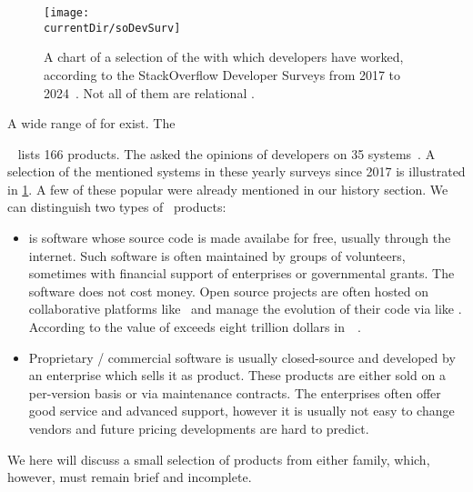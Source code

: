 %
\label{sec:software}%
\FloatBarrier%
%
\begin{figure}%
\centering%
\texttt{[image: \\currentDir/soDevSurv]}%
\caption{A chart of a selection of the  with which developers have worked, according to the StackOverflow Developer Surveys from 2017 to 2024~\cite{SE:SO:2024DS}. %
Not all of them are relational .}%
\label{fig:soDevSurv}%
\end{figure}%
%
A wide range of  for  exist.
The \begin{noglslink}\end{noglslink}~\cite{RS2025DERORD} lists 166 products.
The  asked the opinions of developers on 35 systems~\cite{SE:SO:2024DS}.
A selection of the mentioned systems in these yearly surveys since 2017 is illustrated in \cref{fig:soDevSurv}.
A few of these popular  were already mentioned in our history section.
We can distinguish two types of \db\ products:%
\begin{itemize}%
%
\item {} is software whose source code is made availabe for free, usually through the internet.
Such software is often maintained by groups of volunteers, sometimes with financial support of enterprises or governmental grants.
The software does not cost money.
Open source projects are often hosted on collaborative platforms like \github\ and manage the evolution of their code via  like \git.
According to \citeauthor{HNZ2024TVOOSS} the value of  exceeds eight trillion dollars in~\citeyear{HNZ2024TVOOSS}~\cite{HNZ2024TVOOSS}.
%
\item Proprietary / commercial software is usually closed-source and developed by an enterprise which sells it as product.
These products are either sold on a per-version basis or via maintenance contracts.
The enterprises often offer good service and advanced support, however it is usually not easy to change vendors and future pricing developments are hard to predict.%
%
\end{itemize}%
%
We here will discuss a small selection of products from either family, which, however, must remain brief and incomplete.%
%
%
